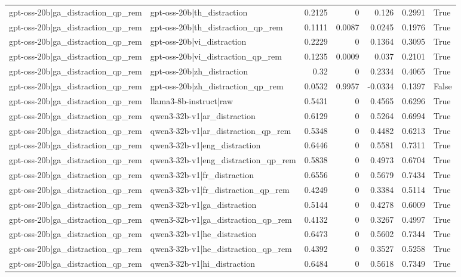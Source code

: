 \begin{table}
\begin{tabular}{l l r r r r l}
gpt-oss-20b|ga_distraction_qp_rem & gpt-oss-20b|th_distraction & 0.2125 & 0 & 0.126 & 0.2991 & True \\
gpt-oss-20b|ga_distraction_qp_rem & gpt-oss-20b|th_distraction_qp_rem & 0.1111 & 0.0087 & 0.0245 & 0.1976 & True \\
gpt-oss-20b|ga_distraction_qp_rem & gpt-oss-20b|vi_distraction & 0.2229 & 0 & 0.1364 & 0.3095 & True \\
gpt-oss-20b|ga_distraction_qp_rem & gpt-oss-20b|vi_distraction_qp_rem & 0.1235 & 0.0009 & 0.037 & 0.2101 & True \\
gpt-oss-20b|ga_distraction_qp_rem & gpt-oss-20b|zh_distraction & 0.32 & 0 & 0.2334 & 0.4065 & True \\
gpt-oss-20b|ga_distraction_qp_rem & gpt-oss-20b|zh_distraction_qp_rem & 0.0532 & 0.9957 & -0.0334 & 0.1397 & False \\
gpt-oss-20b|ga_distraction_qp_rem & llama3-8b-instruct|raw & 0.5431 & 0 & 0.4565 & 0.6296 & True \\
gpt-oss-20b|ga_distraction_qp_rem & qwen3-32b-v1|ar_distraction & 0.6129 & 0 & 0.5264 & 0.6994 & True \\
gpt-oss-20b|ga_distraction_qp_rem & qwen3-32b-v1|ar_distraction_qp_rem & 0.5348 & 0 & 0.4482 & 0.6213 & True \\
gpt-oss-20b|ga_distraction_qp_rem & qwen3-32b-v1|eng_distraction & 0.6446 & 0 & 0.5581 & 0.7311 & True \\
gpt-oss-20b|ga_distraction_qp_rem & qwen3-32b-v1|eng_distraction_qp_rem & 0.5838 & 0 & 0.4973 & 0.6704 & True \\
gpt-oss-20b|ga_distraction_qp_rem & qwen3-32b-v1|fr_distraction & 0.6556 & 0 & 0.5679 & 0.7434 & True \\
gpt-oss-20b|ga_distraction_qp_rem & qwen3-32b-v1|fr_distraction_qp_rem & 0.4249 & 0 & 0.3384 & 0.5114 & True \\
gpt-oss-20b|ga_distraction_qp_rem & qwen3-32b-v1|ga_distraction & 0.5144 & 0 & 0.4278 & 0.6009 & True \\
gpt-oss-20b|ga_distraction_qp_rem & qwen3-32b-v1|ga_distraction_qp_rem & 0.4132 & 0 & 0.3267 & 0.4997 & True \\
gpt-oss-20b|ga_distraction_qp_rem & qwen3-32b-v1|he_distraction & 0.6473 & 0 & 0.5602 & 0.7344 & True \\
gpt-oss-20b|ga_distraction_qp_rem & qwen3-32b-v1|he_distraction_qp_rem & 0.4392 & 0 & 0.3527 & 0.5258 & True \\
gpt-oss-20b|ga_distraction_qp_rem & qwen3-32b-v1|hi_distraction & 0.6484 & 0 & 0.5618 & 0.7349 & True \\

\end{tabular}
\end{table}
